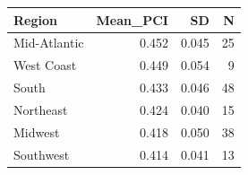 \begin{tabular}{lrrr}
\toprule
Region & Mean_PCI & SD & N \\
\midrule
Mid-Atlantic & 0.452 & 0.045 & 25 \\
West Coast & 0.449 & 0.054 & 9 \\
South & 0.433 & 0.046 & 48 \\
Northeast & 0.424 & 0.040 & 15 \\
Midwest & 0.418 & 0.050 & 38 \\
Southwest & 0.414 & 0.041 & 13 \\
\bottomrule
\end{tabular}
